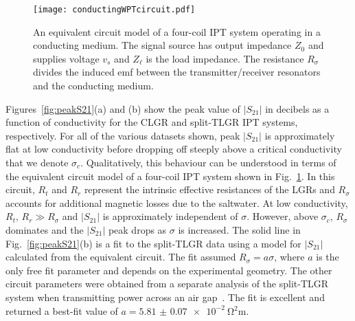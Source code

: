 \documentclass[conference]{IEEEtran}
\begin{document}
\begin{figure}[t]
\centerline{\texttt{[image: conductingWPTcircuit.pdf]}}
\caption{An equivalent circuit model of a four-coil IPT system operating in a conducting medium.  The signal source has output impedance $Z_0$ and supplies voltage $v_s$ and $Z_\ell$ is the load impedance.  The resistance $R_\sigma$ divides the induced emf between the transmitter/receiver resonators and the conducting medium.}
\label{fig:circuit}
\end{figure}
Figures~\ref{fig:peakS21}(a) and (b) show the peak value of $\left\vert S_{21}\right\vert$ in decibels as a function of conductivity for the CLGR and split-TLGR IPT systems, respectively.  For all of the various datasets shown, peak $\left\vert S_{21}\right\vert$ is approximately flat at low conductivity before dropping off steeply above a critical conductivity that we denote $\sigma_c$.  Qualitatively, this behaviour can be understood in terms of the equivalent circuit model of a four-coil IPT system shown in Fig.~\ref{fig:circuit}.  In this circuit, $R_t$ and $R_r$ represent the intrinsic effective resistances of the LGRs and $R_\sigma$ accounts for additional magnetic losses due to the saltwater.  At low conductivity, $R_t,\, R_r\gg R_\sigma$ and $\left\vert S_{21}\right\vert$ is approximately independent of $\sigma$.  However, above $\sigma_c$, $R_\sigma$ dominates and the $\left\vert S_{21}\right\vert$ peak drops as $\sigma$ is increased.  The solid line in Fig.~\ref{fig:peakS21}(b) is a fit to the split-TLGR data using a model for $\left\vert S_{21}\right\vert$ calculated from the equivalent circuit.  The fit assumed $R_\sigma = a \sigma$, where $a$ is the only free fit parameter and depends on the experimental geometry.  The other circuit parameters were obtained from a separate analysis of the split-TLGR system when transmitting power across an air gap~\cite{Roberts:2020}.  The fit is excellent and returned a best-fit value of $a=\SI[{scientific-notation = true, separate-uncertainty = true}]{5.81(7)e-2}{\ohm^2\meter}$. 
\end{document}
